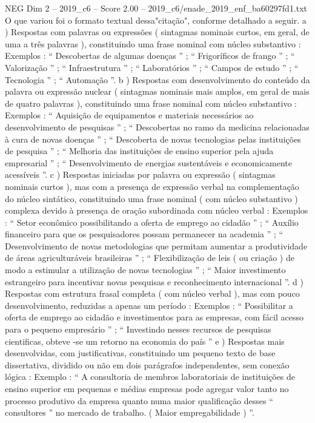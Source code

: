 \begin{textsample}{NEG Dim 2 – 2019\_c6 – Score 2.00 – 2019\_c6/enade\_2019\_enf\_ba60297fd1.txt}
O que variou foi o formato textual dessa"citação", conforme detalhado a seguir. a ) Respostas com palavras ou expressões ( sintagmas nominais curtos, em geral, de uma a três palavras ), constituindo uma frase nominal com núcleo substantivo : Exemplos : “ Descobertas de algumas doenças ” ; “ Frigoríficos de frango ” ; “ Valorização ” ; “ Infraestrutura ” ; “ Laboratórios ” ; “ Campos de estudo ” ; “ Tecnologia ” ; “ Automação ”. b ) Respostas com desenvolvimento do conteúdo da palavra ou expressão nuclear ( sintagmas nominais mais amplos, em geral de mais de quatro palavras ), constituindo uma frase nominal com núcleo substantivo : Exemplos : “ Aquisição de equipamentos e materiais necessários ao desenvolvimento de pesquisas ” ; “ Descobertas no ramo da medicina relacionadas à cura de novas doenças ” ; “ Descoberta de novas tecnologias pelas instituições de pesquisa ” ; “ Melhoria das instituições de ensino superior pela ajuda empresarial ” ; “ Desenvolvimento de energias sustentáveis e economicamente acessíveis ”. c ) Respostas iniciadas por palavra ou expressão ( sintagmas nominais curtos ), mas com a presença de expressão verbal na complementação do núcleo sintático, constituindo uma frase nominal ( com núcleo substantivo ) complexa devido à presença de oração subordinada com núcleo verbal : Exemplos : “ Setor econômico possibilitando a oferta de emprego ao cidadão ” ; “ Auxílio financeiro para que os pesquisadores possam permanecer na academia ” ; “ Desenvolvimento de novas metodologias que permitam aumentar a produtividade de áreas agriculturáveis brasileiras ” ; “ Flexibilização de leis ( ou criação ) de modo a estimular a utilização de novas tecnologias ” ; “ Maior investimento estrangeiro para incentivar novas pesquisas e reconhecimento internacional ”. d ) Respostas com estrutura frasal completa ( com núcleo verbal ), mas com pouco desenvolvimento, reduzidas a apenas um período : Exemplos : “ Possibilitar a oferta de emprego ao cidadão e investimentos para as empresas, com fácil acesso para o pequeno empresário ” ; “ Investindo nesses recursos de pesquisas cientificas, obteve -se um retorno na economia do país ” e ) Respostas mais desenvolvidas, com justificativas, constituindo um pequeno texto de base dissertativa, dividido ou não em dois parágrafos independentes, sem conexão lógica : Exemplo : “ A consultoria de membros laboratoriais de instituições de ensino superior em pequenas e médias empresas pode agregar valor tanto no processo produtivo da empresa quanto numa maior qualificação desses “ consultores ” no mercado de trabalho. ( Maior empregabilidade ) ”.

\end{textsample}
